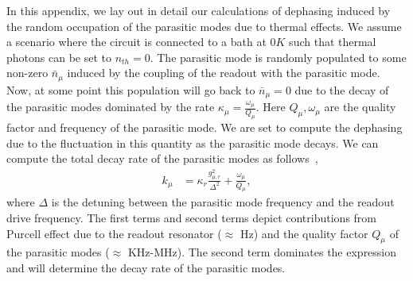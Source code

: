 \documentclass[%
reprint,
superscriptaddress,
 amsmath,amssymb,
 aps,
 prx,
longbibliography,
floatfix,
]{revtex4-2}
\begin{document}
In this appendix, we lay out in detail our calculations of dephasing induced by the random occupation of the parasitic modes due to thermal effects. We assume a scenario where the circuit is connected to a bath at $0K$ such that thermal photons can be set to $n_{th}=0$. The parasitic mode is randomly populated to some non-zero $\bar n_\mu$ induced by the coupling of the readout with the parasitic mode. Now, at some point this population will go back to $\bar n_\mu=0$ due to the decay of the parasitic modes dominated by the rate $\kappa_\mu=\frac{\omega_\mu}{Q_\mu}$. Here $Q_\mu,\omega_\mu$ are the quality factor and frequency of the parasitic mode. We are set to compute the dephasing due to the fluctuation in this quantity as the parasitic mode decays. We can compute the total decay rate of the parasitic modes as follows~\cite{gambetta2006qubit}, 
\begin{align}
k_\mu&=\kappa_r \frac{g_{\mu,r}^2}{\Delta^2}+\frac{\omega_\mu}{Q_\mu},
\end{align}
where $\Delta$ is the detuning between the parasitic mode frequency and the readout drive frequency. The first terms and second terms depict contributions from Purcell effect due to the readout resonator ($\approx$ Hz) and the quality factor $Q_\mu$ of the parasitic modes ($\approx$ KHz-MHz). The second term dominates the expression and will determine the decay rate of the parasitic modes. 
 
\end{document}
